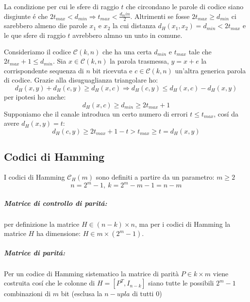                 \begin{sloppypar}
                    La condizione per cui le sfere di raggio $t$ che circondano le parole di codice siano disgiunte é che ${2t_{max} < d_{min}\Rightarrow t_{max} < \frac{d_min}{2}}$.
                    Altrimenti se fosse  ${2t_{max} \geq d_{min}}$ ci sarebbero almeno die parole $x_1$ e $x_2$ la cui distanza ${d_H(x_1,x_2) = d_{min} < 2t_{max} }$ e le que sfere di raggio
                    $t$ avrebbero almno un unto in comune.
                \end{sloppypar}
                
                \begin{sloppypar}
                    Consideriamo il codice $\mathcal{C}(k,n)$ che ha una certa $d_{min}$ e $t_{max}$ tale che ${2t_{max}+1 \leq d_{min}}$. Sia $x\in\mathcal{C}(k,n)$ la parola trasmessa,
                    ${y = x+e}$ la corrispondente sequenza di $n$ bit ricevuta e $c\in\mathcal{C}(k,n)$ un'altra generica parola di codice. Grazie alla disuguaglianza triangolare ho:
                    \[
                        d_H(x,y) + d_H(c,y) \geq d_H(x,c) \Rightarrow d_H(c,y) \leq d_H(x,c) - d_H(x,y)  
                    \]
                    per ipotesi ho anche:
                    \[
                        d_H(x,c) \geq d_{min} \geq 2t_{max}+1 
                    \]
                    Supponiamo che il canale introduca un certo numero di errori ${t\leq} t_{max}$, cosí da avere $d_H(x,y) = t$:
                    \[
                        d_H(c,y) \geq 2t_{max}+1 -t > t_{max} \geq t = d_H(x,y)   
                    \]   
                \end{sloppypar}
                
    \subsection{Codici di Hamming}
        I codici di Hamming $\mathcal{C}_H(m)$ sono definiti a partire da un parametro: $m \geq 2$
        \[
            n = 2^m-1,\ k = 2^m-m-1 = n-m
        \]
        \subparagraph{Matrice di controllo di paritá:} per definizione la matrice $H \in (n-k)\times n$, ma per i codici di Hamming la matrice $H$ ha dimensione:
        $H \in m\times (2^m-1)$.

        \subparagraph{Matrice di paritá:} Per un codice di Hamming sistematico la matrice di parità $P\in k \times m$ viene costruita cosí che le colonne di $H = [P^T,I_{n-k}]$
        siano tutte le possibili $2^m-1$ combinazioni di $m$ bit (esclusa la $n-upla$ di tutti 0)

